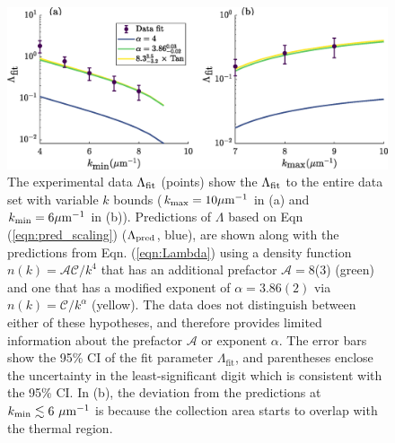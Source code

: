 	\begin{figure}
	\begin{center}
		\includegraphics[width=\columnwidth]{fig/QD/k_indep}
			\caption{The experimental data {$\Lambda_{\rm fit}$} (points) show the $\Lambda_{\rm fit}$ to the entire data set with variable $k$ bounds ($k_\textrm{max}=10\mu\textrm{m}^{-1}$ in (a) and $k_\textrm{min}=6\mu\textrm{m}^{-1}$ in (b)).
		Predictions of $\Lambda$ based on Eqn (\ref{eqn:pred_scaling}) ({$\Lambda_{\rm pred}$}, blue), are shown along with the predictions {from Eqn. (\ref{eqn:Lambda}) using} a density function $n(k){=\mathcal{AC}/k^4}$ that {has an additional prefactor $\mathcal{A}=$8(3)} %
		(green) and one that has %
		a modified exponent of {$\alpha=3.86(2)$ via $n(k)=\mathcal{C}/k^{\alpha}$} (yellow). 
		The data does not distinguish between either of these hypotheses, and therefore provides limited information about {the prefactor $\mathcal{A}$ or exponent}%
		$\alpha$.
		The error bars show the 95\% CI of the fit parameter $\Lambda_\textrm{fit}$, and parentheses enclose the uncertainty in the least-significant digit which is consistent with the 95\% CI.
			In (b), the deviation from the predictions at $k_\textrm{min}\lesssim6~\mu\textrm{m}^{-1}$ is because the collection area starts to overlap with the thermal region.
			}
		\label{fig:k_indep}
	\end{center}
	\end{figure}


